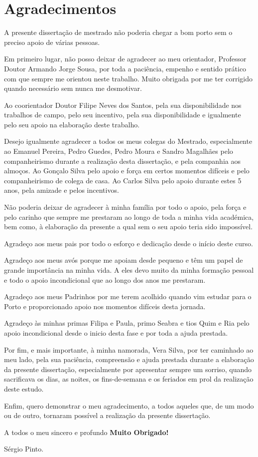 \chapter*{Agradecimentos}

A presente dissertação de mestrado não poderia chegar a bom porto sem o preciso apoio de várias pessoas.

Em primeiro lugar, não posso deixar de agradecer ao meu orientador, Professor Doutor Armando Jorge Sousa, por toda a paciência, empenho e sentido prático com que sempre me orientou neste trabalho. Muito obrigada por me ter corrigido quando necessário sem nunca me desmotivar.

Ao coorientador Doutor Filipe Neves dos Santos, pela sua disponibilidade nos trabalhos de campo, pelo seu incentivo, pela sua disponibilidade e igualmente pelo seu apoio na elaboração deste trabalho.



Desejo igualmente agradecer a todos os meus colegas do Mestrado, especialmente ao Emanuel Pereira, Pedro Guedes, Pedro Moura e Sandro Magalhães pelo companheirismo durante a realização desta dissertação, e pela companhia aos almoços. Ao Gonçalo Silva pelo apoio e força em certos momentos difíceis e pelo companheirismo de colega de casa. Ao Carlos Silva pelo apoio durante estes 5 anos, pela amizade e pelos incentivos.

Não poderia deixar de agradecer à minha família por todo o apoio, pela força e pelo carinho que sempre me prestaram ao longo de toda a minha vida académica, bem como, à elaboração da presente a qual sem o seu apoio teria sido impossível.

Agradeço aos meus pais por todo o esforço e dedicação desde o início deste curso.

Agradeço aos meus avós porque me apoiam desde pequeno e têm um papel de grande importância na minha vida. A eles devo muito da minha formação pessoal e todo o apoio incondicional
que ao longo dos anos me prestaram.

Agradeço aos meus Padrinhos por me terem acolhido quando vim estudar
para o Porto e proporcionado apoio nos momentos difíceis desta jornada.

Agradeço às minhas primas Filipa e Paula, primo Seabra e tios Quim e Ria pelo apoio incondicional desde o inicio desta fase e por toda a ajuda prestada.


Por fim, e mais importante, à minha namorada, Vera Silva, por ter caminhado ao meu lado, pela sua paciência, compreensão e ajuda prestada durante a elaboração da presente dissertação, especialmente por apresentar sempre um sorriso, quando sacrificava os dias, as noites, os fins-de-semana e os feriados em prol da realização deste estudo. 

Enfim, quero demonstrar o meu agradecimento, a todos aqueles que, de um modo ou de outro, tornaram possível a realização da presente dissertação.


  
A todos o meu sincero e profundo \textbf{Muito Obrigado!}

Sérgio Pinto.